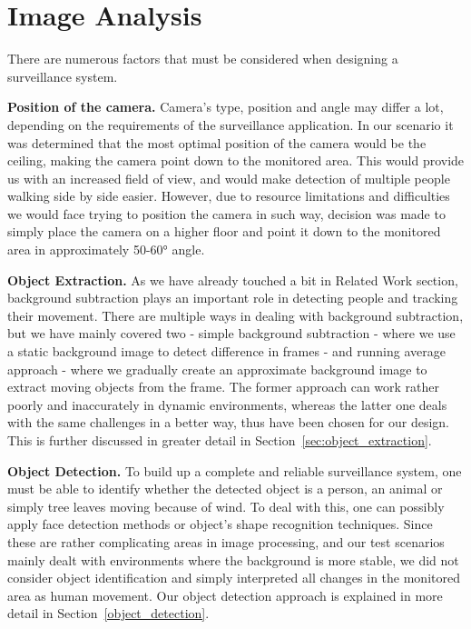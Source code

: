\section{Image Analysis}
\label{sec:analysis_img}
There are numerous factors that must be considered when designing a surveillance system.

{\bfseries Position of the camera.} Camera's type, position and angle may differ a lot, depending on the requirements of the surveillance application. In our scenario it was determined that the most optimal position of the camera would be the ceiling, making the camera point down to the monitored area. This would provide us with an increased field of view, and would make detection of multiple people walking side by side easier. However, due to resource limitations and difficulties we would face trying to position the camera in such way, decision was made to simply place the camera on a higher floor and point it down to the monitored area in approximately 50-60\si{\degree} angle.

{\bfseries Object Extraction.} As we have already touched a bit in Related Work section, background subtraction plays an important role in detecting people and tracking their movement. There are multiple ways in dealing with background subtraction, but we have mainly covered two - simple background subtraction - where we use a static background image to detect difference in frames - and running average approach - where we gradually create an approximate background image to extract moving objects from the frame. The former approach can work rather poorly and inaccurately in dynamic environments, whereas the latter one deals with the same challenges in a better way, thus have been chosen for our design. This is further discussed in greater detail in Section~\ref{sec:object_extraction}.

{\bfseries Object Detection.} To build up a complete and reliable surveillance system, one must be able to identify whether the detected object is a person, an animal or simply tree leaves moving because of wind. To deal with this, one can possibly apply face detection methods or object's shape recognition techniques. Since these are rather complicating areas in image processing, and our test scenarios mainly dealt with environments where the background is more stable, we did not consider object identification and simply interpreted all changes in the monitored area as human movement. Our object detection approach is explained in more detail in Section~\ref{object_detection}.

